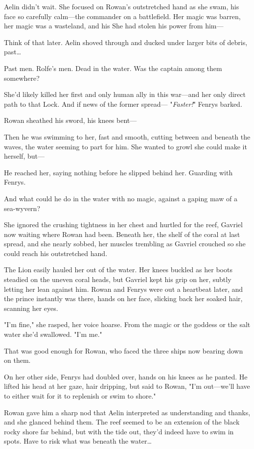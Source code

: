 Aelin didn't wait. She focused on Rowan's outstretched hand as she swam, his face so carefully calm---the commander on a battlefield. Her magic was barren, her magic was a wasteland, and his  She had stolen his power from him---

Think of that later. Aelin shoved through and ducked under larger bits of debris, past\ldots{}

Past men. Rolfe's men. Dead in the water. Was the captain among them somewhere?

She'd likely killed her first and only human ally in this war---and her only direct path to that Lock. And if news of the former spread--- "\emph{Faster!}" Fenrys barked.

Rowan sheathed his sword, his knees bent---

Then he was swimming to her, fast and smooth, cutting between and beneath the waves, the water seeming to part for him. She wanted to growl she could make it herself, but---

He reached her, saying nothing before he slipped behind her. Guarding with Fenrys.

And what could he do in the water with no magic, against a gaping maw of a sea-wyvern?

She ignored the crushing tightness in her chest and hurtled for the reef, Gavriel now waiting where Rowan had been. Beneath her, the shelf of the coral at last spread, and she nearly sobbed, her muscles trembling as Gavriel crouched so she could reach his outstretched hand.

The Lion easily hauled her out of the water. Her knees buckled as her boots steadied on the uneven coral heads, but Gavriel kept his grip on her, subtly letting her lean against him. Rowan and Fenrys were out a heartbeat later, and the prince instantly was there, hands on her face, slicking back her soaked hair, scanning her eyes.

"I'm fine," she rasped, her voice hoarse. From the magic or the goddess or the salt water she'd swallowed. "I'm me."

That was good enough for Rowan, who faced the three ships now bearing down on them.

On her other side, Fenrys had doubled over, hands on his knees as he panted. He lifted his head at her gaze, hair dripping, but said to Rowan, "I'm out---we'll have to either wait for it to replenish or swim to shore."

Rowan gave him a sharp nod that Aelin interpreted as understanding and thanks, and she glanced behind them. The reef seemed to be an extension of the black rocky shore far behind, but with the tide out, they'd indeed have to swim in spots. Have to risk what was beneath the water\ldots{}

